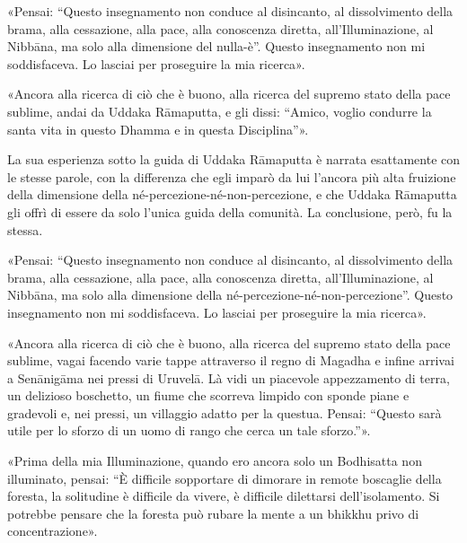 «Pensai: “Questo insegnamento non conduce al disincanto, al
dissolvimento della brama, alla cessazione, alla pace, alla conoscenza
diretta, all’Illuminazione, al Nibbāna, ma solo alla dimensione del
nulla-è”. Questo insegnamento non mi soddisfaceva. Lo lasciai per
proseguire la mia ricerca».


«Ancora alla ricerca di ciò che è buono, alla ricerca del supremo stato
della pace sublime, andai da Uddaka Rāmaputta, e gli dissi: “Amico,
voglio condurre la santa vita in questo Dhamma e in questa Disciplina”».




 La sua esperienza sotto la guida di Uddaka Rāmaputta è
narrata esattamente con le stesse parole, con la differenza che egli
imparò da lui l’ancora più alta fruizione della dimensione della
né-percezione-né-non-percezione, e che Uddaka Rāmaputta gli offrì di
essere da solo l’unica guida della comunità. La conclusione, però, fu la
stessa.


 «Pensai: “Questo insegnamento non conduce al disincanto, al
dissolvimento della brama, alla cessazione, alla pace, alla conoscenza
diretta, all’Illuminazione, al Nibbāna, ma solo alla dimensione della
né-percezione-né-non-percezione”. Questo insegnamento non mi
soddisfaceva. Lo lasciai per proseguire la mia ricerca».


«Ancora alla ricerca di ciò che è buono, alla ricerca del supremo stato
della pace sublime, vagai facendo varie tappe attraverso il regno di
Magadha e infine arrivai a Senānigāma nei pressi di Uruvelā. Là vidi un
piacevole appezzamento di terra, un delizioso boschetto, un fiume che
scorreva limpido con sponde piane e gradevoli e, nei pressi, un
villaggio adatto per la questua. Pensai: “Questo sarà utile per lo
sforzo di un uomo di rango che cerca un tale sforzo.”».




«Prima della mia Illuminazione, quando ero ancora solo un Bodhisatta non
illuminato, pensai: “È difficile sopportare di dimorare in remote
boscaglie della foresta, la solitudine è difficile da vivere, è
difficile dilettarsi dell’isolamento. Si potrebbe pensare che la foresta
può rubare la mente a un bhikkhu privo di concentrazione».


